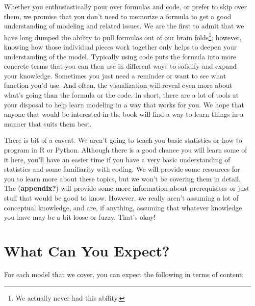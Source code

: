 \documentclass[
  letterpaper,
]{krantz}
\begin{document}
Whether you enthusiastically pour over formulas and code, or prefer to
skip over them, we promise that you don't need to memorize a formula to
get a good understanding of modeling and related issues. We are the
first to admit that we have long dumped the ability to pull formulas out
of our brain folds\footnote{We actually never had this ability.};
however, knowing how those individual pieces work together only helps to
deepen your understanding of the model. Typically using code puts the
formula into more concrete terms that you can then use in different ways
to solidify and expand your knowledge. Sometimes you just need a
reminder or want to see what function you'd use. And often, the
visualization will reveal even more about what's going than the formula
or the code. In short, there are a lot of tools at your disposal to help
learn modeling in a way that works for you. We hope that anyone that
would be interested in the book will find a way to learn things in a
manner that suits them best.

There is bit of a caveat. We aren't going to teach you basic statistics
or how to program in R or Python. Although there is a good chance you
will learn some of it here, you'll have an easier time if you have a
very basic understanding of statistics and some familiarity with coding.
We will provide some resources for you to learn more about these topics,
but we won't be covering them in detail. The (\textbf{appendix?}) will
provide some more information about prerequisites or just stuff that
would be good to know. However, we really aren't assuming a lot of
conceptual knowledge, and are, if anything, assuming that whatever
knowledge you have may be a bit loose or fuzzy. That's okay!

\section{What Can You Expect?}\label{what-can-you-expect}

For each model that we cover, you can expect the following in terms of
content:
\end{document}
